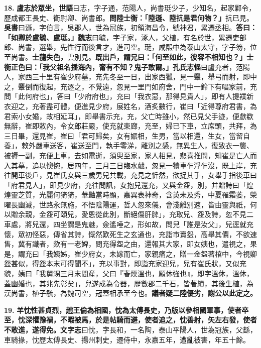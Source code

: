 \textbf{18.} \textbf{盧志於眾坐，}{\footnotesize \textbf{世語}曰志，字子通，范陽人，尚書珽少子，少知名，起家鄴令，歷成都王長史、衛尉卿、尚書郎。}\textbf{問陸士衡：「陸遜、陸抗是君何物？」}{\footnotesize 抗已見。\textbf{吳書}曰遜，字伯言，吳郡人，世為冠族，初領海昌令，號神君，累遷丞相。}\textbf{答曰：「如卿於盧毓、盧珽。」}{\footnotesize \textbf{魏志}曰毓，字子家，涿人，父植，有名於世，累遷吏部郎、尚書，選舉，先性行而後言才，進司空。珽，咸熙中為泰山太守，字子笏，位至尚書。}\textbf{士龍失色，}{\footnotesize 雲別見。}\textbf{既出戶，謂兄曰：「何至如此，彼容不相知也？」士衡正色曰：「我父祖名播海內，甯有不知？鬼子敢爾。」}{\footnotesize \textbf{孔氏志怪}曰盧充者，范陽人，家西三十里有崔少府墓，充先冬至一日，出家西獵，見一麞，舉弓而射，即中之，麞倒而復起，充逐之，不覺遠，忽見一里門如府舍，門中一鈴下有唱家前，充問「此何府也」，答曰「少府府也」，充曰「我衣惡，那得見貴人」，即有人提襆新衣迎之，充著盡可體，便進見少府，展姓名，酒炙數行，崔曰「近得尊府君書，為君索小女婚，故相延耳」，即舉書示充，充，父亡時雖小，然已見父手迹，便歔欷無辭，崔即敕內，令女郎莊嚴，使充就東廊，充至，婦已下車，立席頭，共拜，為三日畢，還見崔，崔曰「君可歸矣，女有娠相，生男，當以相還，生女，當留自養」，敕外嚴車送客，崔送至門，執手零涕，離別之感，無異生人，復致衣一襲、被褥一副，充便上車，去如電逝，須臾至家，家人相見，悲喜推問，知崔是亡人而入其墓，追以懊惋，居四年，三月三日臨水戲，忽見一犢車乍浮乍沒，既上岸，充往開車後戶，見崔氏女與三歲男兒共載，充見之忻然，欲捉其手，女舉手指後車曰「府君見人」，即見少府，充往問訊，女抱兒還充，又與金盌，別，并贈詩曰「煌煌靈芝質，光麗何猗猗，華豔當時顯，嘉異表神奇，含英未及秀，中夏罹霜萎，榮曜長幽滅，世路永無施，不悟陰陽運，哲人忽來儀，會淺離別速，皆由靈與祇，何以贈余親，金盌可頤兒，愛恩從此別，斷絕傷肝脾」，充取兒、盌及詩，忽不見二車處，將兒還，四坐謂是鬼魅，僉遙唾之，形如故，問兒「誰是汝父」，兒逕就充懷，眾初怪惡，傳省其詩，慨然歎死生之玄通也，充詣市賣盌，高舉其價，不欲速售，冀有識者，欻有一老婢，問充得盌之由，還報其大家，即女姨也，遣視之，果是，謂充曰「我姨姊，崔少府女，未嫁而亡，家親痛之，贈一金盌著棺中，今視卿盌甚似，得盌本末可得聞不」，充以事對，即詣充家迎兒，兒有崔氏狀，又似充貌，姨曰「我舅甥三月末間産，父曰『春煗溫也，願休強也』，即字溫休，溫休，蓋幽婚也，其兆先彰矣」，兒遂成為令器，歷數郡二千石，皆著績，其後生植，為漢尚書，植子毓，為魏司空，冠蓋相承至今也。}\textbf{議者疑二陸優劣，謝公以此定之。}

\textbf{19.} \textbf{羊忱性甚貞烈，趙王倫為相國，忱為太傅長史，乃版以參相國軍事，使者卒至，忱深懼豫禍，不暇被馬，於是帖騎而避，使者追之，忱善射，矢左右發，使者不敢進，遂得免。}{\footnotesize \textbf{文字志}曰忱，字長和，一名陶，泰山平陽人，世為冠族，父繇，車騎掾，忱歷太傅長史、揚州刺史，遷侍中，永嘉五年，遭亂被害，年五十餘。}

